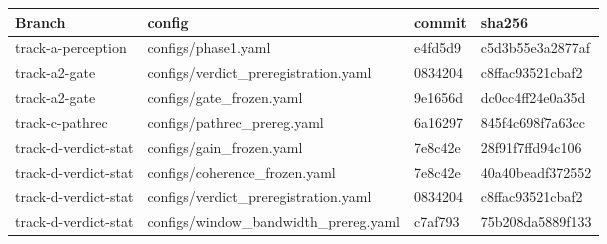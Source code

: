 \begin{tabular}{llll}
\toprule
Branch & config & commit & sha256 \\
\midrule
track-a-perception & configs/phase1.yaml & e4fd5d9 & c5d3b55e3a2877af \\
track-a2-gate & configs/verdict\_preregistration.yaml & 0834204 & c8ffac93521cbaf2 \\
track-a2-gate & configs/gate\_frozen.yaml & 9e1656d & dc0cc4ff24e0a35d \\
track-c-pathrec & configs/pathrec\_prereg.yaml & 6a16297 & 845f4c698f7a63cc \\
track-d-verdict-stat & configs/gain\_frozen.yaml & 7e8c42e & 28f91f7ffd94c106 \\
track-d-verdict-stat & configs/coherence\_frozen.yaml & 7e8c42e & 40a40beadf372552 \\
track-d-verdict-stat & configs/verdict\_preregistration.yaml & 0834204 & c8ffac93521cbaf2 \\
track-d-verdict-stat & configs/window\_bandwidth\_prereg.yaml & c7af793 & 75b208da5889f133 \\
\bottomrule
\end{tabular}
